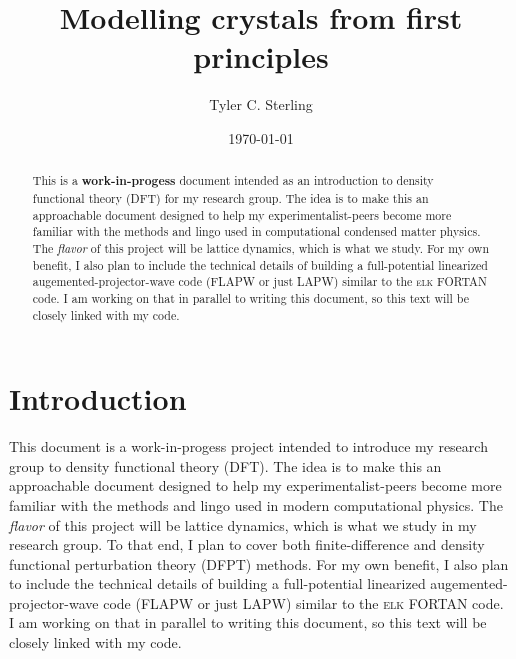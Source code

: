 \documentclass[prb,aps,11pt,superscriptaddress,floatfix]{revtex4-2}
\begin{document}
\title{Modelling crystals from first principles}

\author{Tyler C. Sterling}

\date{\today}

\begin{abstract}
This is a \textbf{work-in-progess} document intended as an introduction to density functional theory (DFT) for my research group. The idea is to make this an approachable document designed to help my experimentalist-peers become more familiar with the methods and lingo used in computational condensed matter physics. The \emph{flavor} of this project will be lattice dynamics, which is what we study. For my own benefit, I also plan to include the technical details of building a full-potential linearized augemented-projector-wave code (FLAPW or just LAPW) similar to the \textsc{elk} FORTAN code. I am working on that in parallel to writing this document, so this text will be closely linked with my code.
\end{abstract}

\maketitle

\tableofcontents


\section{Introduction}

This document is a work-in-progess project intended to introduce my research group to density functional theory (DFT). The idea is to make this an approachable document designed to help my experimentalist-peers become more familiar with the methods and lingo used in modern computational physics. The \emph{flavor} of this project will be lattice dynamics, which is what we study in my research group. To that end, I plan to cover both finite-difference and density functional perturbation theory (DFPT) methods. For my own benefit, I also plan to include the technical details of building a full-potential linearized augemented-projector-wave code (FLAPW or just LAPW) similar to the \textsc{elk} FORTAN code. I am working on that in parallel to writing this document, so this text will be closely linked with my code.  
\end{document}

